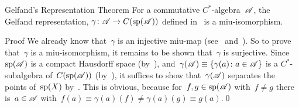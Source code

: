 \documentclass[a]{subfiles}
\begin{document}
\begin{parsec}
\begin{point}[gelfand]{Gelfand's Representation Theorem}
For a commutative $C^*$-algebra~$\mathscr{A}$,
the Gelfand representation, 
 $\gamma\colon \mathscr{A}\to C(\mathrm{sp}(\mathscr{A}))$
defined in~
is a miu-isomorphism.
\begin{point}{Proof}%
We already know that~$\gamma$ is an injective miu-map
(see~ 
and~).
So to prove that~$\gamma$ is a miu-isomorphism,
it remains to be shown that~$\gamma$ is surjective.
Since~$\mathrm{sp}(\mathscr{A})$ is a compact Hausdorff space 
(by~),
and~$\gamma(\mathscr{A})\equiv \{\gamma(a)\colon a\in \mathscr{A}\}$
is a $C^*$-subalgebra of~$C(\mathrm{sp}(\mathscr{A}))$
(by~),
it suffices to show that~$\gamma(\mathscr{A})$
separates the points of~$\mathrm{sp}(X)$
by~.
This is obvious,
because
for~$f,g\in \mathrm{sp}(\mathscr{A})$ with~$f\neq g$
there is~$a\in \mathscr{A}$ with~$f(a)\equiv \gamma(a)(f)
\neq \gamma(a)(g)\equiv g(a)$.\qed
\end{point}
\end{point}
\end{parsec}
\end{document}
